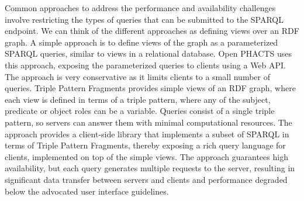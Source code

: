 Common approaches to address the performance and availability challenges involve restricting the types of queries that can be submitted to the SPARQL endpoint.
We can think of the different approaches as defining views over an RDF graph.
A simple approach is to define views of the graph as a parameterized SPARQL queries, similar to views in a relational database.
Open PHACTS uses this approach, exposing the parameterized queries to clients using a Web API.
The approach is very conservative as it limits clients to a small number of queries.
%
Triple Pattern Fragments \cite{Verborgh2014} provides simple views of an RDF graph, where each view is defined in terms of a triple pattern, where any of the subject, predicate or object roles can be a variable.
Queries consist of a single triple pattern, so servers can answer them with minimal computational resources.
The approach provides a client-side library that implements a subset of SPARQL in terms of Triple Pattern Fragments, thereby exposing a rich query language for clients, implemented on top of the simple views.
The approach guarantees high availability, but each query generates multiple requests to the server, resulting in significant data transfer between servers and clients and performance degraded below the advocated user interface guidelines. 


